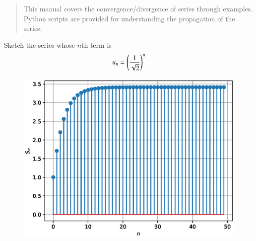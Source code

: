 \documentclass[journal,12pt,twocolumn]{IEEEtran}
\begin{document}
%
\IEEEpeerreviewmaketitle

\bigskip

\begin{abstract}
This manual covers the convergence/divergence of series through examples.  Python scripts are provided for understanding the propagation of the series.
\end{abstract}
%

\begin{problem}
\label{prob:ratio}
Sketch the series whose $n$th term is 
\begin{equation}
\label{eq:ratio}
u_{n}=\left(\frac{1}{\sqrt{2}}\right)^{n}
\end{equation}
\end{problem}
%
\solution
%

%
\begin{figure}[!ht]
\begin{center}
\includegraphics[width=\columnwidth]{./figs/1.eps}
\end{center}

\label{fig:1}	
\end{figure}
\end{document}
